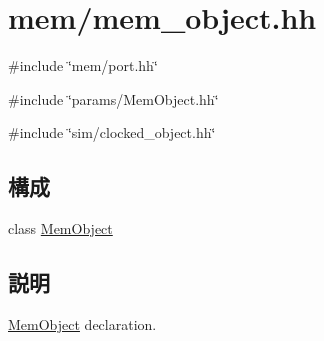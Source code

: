 \hypertarget{mem__object_8hh}{
\section{mem/mem\_\-object.hh}
\label{mem__object_8hh}
}
{\ttfamily \#include \char`\"{}mem/port.hh\char`\"{}}\par
{\ttfamily \#include \char`\"{}params/MemObject.hh\char`\"{}}\par
{\ttfamily \#include \char`\"{}sim/clocked\_\-object.hh\char`\"{}}\par
\subsection*{構成}
\begin{DoxyCompactItemize}
\item 
class \hyperlink{classMemObject}{MemObject}
\end{DoxyCompactItemize}


\subsection{説明}
\hyperlink{classMemObject}{MemObject} declaration. 